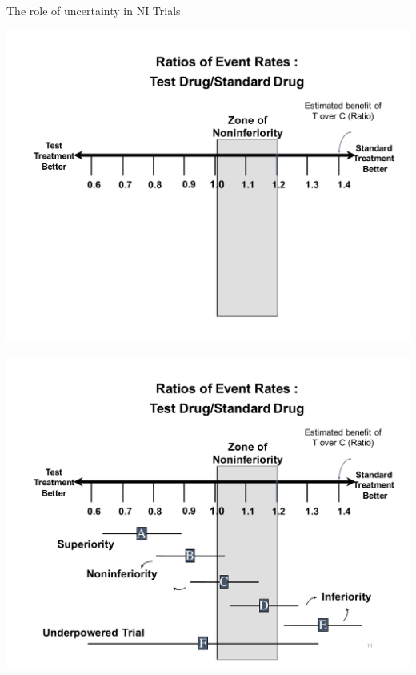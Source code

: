 \documentclass[ignorenonframetext,]{beamer}
\begin{document}
\begin{frame}{The role of uncertainty in NI Trials}
\protect\hypertarget{the-role-of-uncertainty-in-ni-trials}{}

\includegraphics{ni_ci_rr_empty.pdf}

\end{frame}

\begin{frame}{}
\protect\hypertarget{section}{}

\includegraphics{ni_ci_rr_full.pdf}

\end{frame}
\end{document}
